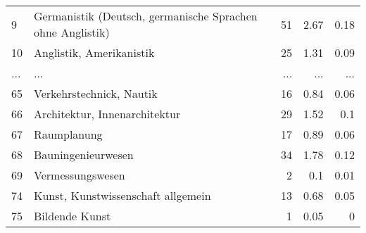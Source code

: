 \begin{longtable}{lXrrr}
        9 & \multicolumn{1}{X}{Germanistik (Deutsch, germanische Sprachen ohne Anglistik)} & %
          \num{51} &
          \num[round-mode=places,round-precision=2]{2.67} &
          \num[round-mode=places,round-precision=2]{0.18} \\
        10 & \multicolumn{1}{X}{Anglistik, Amerikanistik} & %
          \num{25} &
          \num[round-mode=places,round-precision=2]{1.31} &
          \num[round-mode=places,round-precision=2]{0.09} \\
       ... & ... & ... & ... & ... \\
        65 & \multicolumn{1}{X}{Verkehrstechnick, Nautik} & %
          \num{16} &
          \num[round-mode=places,round-precision=2]{0.84} &
          \num[round-mode=places,round-precision=2]{0.06} \\

        66 & \multicolumn{1}{X}{Architektur, Innenarchitektur} & %
          \num{29} &
          \num[round-mode=places,round-precision=2]{1.52} &
          \num[round-mode=places,round-precision=2]{0.1} \\

        67 & \multicolumn{1}{X}{Raumplanung} & %
          \num{17} &
          \num[round-mode=places,round-precision=2]{0.89} &
          \num[round-mode=places,round-precision=2]{0.06} \\

        68 & \multicolumn{1}{X}{Bauningenieurwesen} & %
          \num{34} &
          \num[round-mode=places,round-precision=2]{1.78} &
          \num[round-mode=places,round-precision=2]{0.12} \\

        69 & \multicolumn{1}{X}{Vermessungswesen} & %
          \num{2} &
          \num[round-mode=places,round-precision=2]{0.1} &
          \num[round-mode=places,round-precision=2]{0.01} \\

        74 & \multicolumn{1}{X}{Kunst, Kunstwissenschaft allgemein} & %
          \num{13} &
          \num[round-mode=places,round-precision=2]{0.68} &
          \num[round-mode=places,round-precision=2]{0.05} \\

        75 & \multicolumn{1}{X}{Bildende Kunst} & %
          \num{1} &
          \num[round-mode=places,round-precision=2]{0.05} &
          \num[round-mode=places,round-precision=2]{0} \\


\end{longtable}
